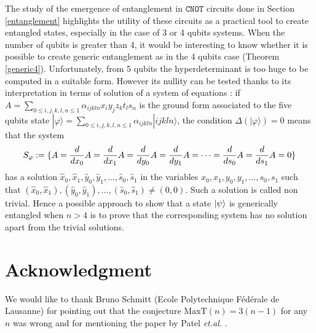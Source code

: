 \documentclass[a4paper,12pt,fleqn]{article}
\newcommand\cnot{\mathtt{CNOT}}
\renewcommand\phi{\varphi}
\renewcommand\leq{\leqslant}
\begin{document}
The study of the emergence of entanglement in $\cnot$ circuits done in Section \ref{entanglement} highlights
the utility of these circuits as a practical tool to create entangled states, especially in the case of 3 or 4 qubits systems. When the number of qubits is greater than 4, it would be interesting to know whether it is possible to create generic entanglement as in the 4 qubits case (Theorem \ref{generic4}).
Unfortunately, from 5 qubits the hyperdeterminant is too huge to be computed in a suitable form. However its nullity can be tested thanks to its interpretation in terms of solution of a system of equations \cite[p.~445]{1992GKL} : if $A=\displaystyle\sum_{0\leq i,j,k,l,n\leq 1}\alpha_{ijkln}x_{i}y_{j}z_{k}t_{l}s_{n}$ is the ground form associated to the five qubits state $|\phi\rangle=\displaystyle\sum_{0\leq i,j,k,l,n\leq 1}\alpha_{ijkln}|ijkln\rangle$, the condition $\Delta(|\phi\rangle)=0$ means that the system
 \begin{equation}
	 S_{\phi}:=\{A={d\over dx_{0}}A={d\over dx_{1}}A={d\over dy_{0}}A={d\over dy_{1}}A=\cdots={d\over ds_{0}}A={d\over ds_{1}}A=0\} \end{equation}
 has a solution  $\hat x_{0},\hat x_{1},\hat y_{0},\hat y_{1},\dots,\hat s_{0},\hat s_{1}$ in the variables $x_{0},x_{1},y_{0},y_{1},\dots,s_{0},s_{1}$ such that $(\hat x_{0},\hat x_{1}),(\hat y_{0},\hat y_{1}),\dots,(\hat s_{0},\hat s_{1})\neq (0,0)$. Such a solution is called non trivial.
 Hence a possible approach to show that a state $\ket{\psi}$ is generically entangled when $n>4$ is to prove that the corresponding system has no solution apart from the trivial solutions.


 
 \section*{Acknowledgment}
 

 We would like to thank Bruno Schmitt (Ecole Polytechnique F\'ed\'erale de Lausanne) for pointing out that the conjecture $\mathrm{MaxT}(n)=3(n-1)$ for any $n$ was wrong and for mentioning the paper by Patel \textit{et.al.} \cite{2004PMH}.

%

%



\appendix
\end{document}
